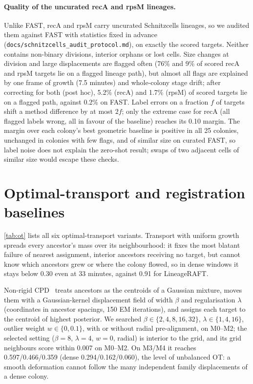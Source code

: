 \documentclass[10pt,twocolumn,letterpaper]{article}
\newcommand{\ours}{LineageRAFT\xspace}
\begin{document}
\paragraph{Quality of the uncurated recA and rpsM lineages.}
Unlike FAST, recA and rpsM carry uncurated Schnitzcells lineages, so we audited them against FAST with statistics fixed in advance (\texttt{docs/schnitzcells\_audit\_protocol.md}), on exactly the scored targets.
Neither contains non-binary divisions, interior orphans or lost cells.
Size changes at division and large displacements are flagged often (76\% and 9\% of scored recA and rpsM targets lie on a flagged lineage path), but almost all flags are explained by one frame of growth (7.5 minutes) and whole-colony stage drift; after correcting for both (post hoc), 5.2\% (recA) and 1.7\% (rpsM) of scored targets lie on a flagged path, against 0.2\% on FAST.
Label errors on a fraction $f$ of targets shift a method difference by at most $2f$; only the extreme case for recA (all flagged labels wrong, all in favour of the baseline) reaches its 0.10 margin.
The margin over each colony's best geometric baseline is positive in all 25 colonies, unchanged in colonies with few flags, and of similar size on curated FAST, so label noise does not explain the zero-shot result; swaps of two adjacent cells of similar size would escape these checks.

\section{Optimal-transport and registration baselines}
\cref{tab:ot} lists all six optimal-transport variants.
Transport with uniform growth spreads every ancestor's mass over its neighbourhood: it fixes the most blatant failure of nearest assignment, interior ancestors receiving no target, but cannot know which ancestors grew or where the colony flowed, so in dense windows it stays below 0.30 even at 33 minutes, against 0.91 for \ours.

Non-rigid CPD~\cite{myronenko2010cpd} treats ancestors as the centroids of a Gaussian mixture, moves them with a Gaussian-kernel displacement field of width $\beta$ and regularisation $\lambda$ (coordinates in ancestor spacings, 150 EM iterations), and assigns each target to the centroid of highest posterior.
We searched $\beta\in\{2,4,8,16,32\}$, $\lambda\in\{1,4,16\}$, outlier weight $w\in\{0,0.1\}$, with or without radial pre-alignment, on M0--M2; the selected setting ($\beta{=}8$, $\lambda{=}4$, $w{=}0$, radial) is interior to the grid, and its grid neighbours score within 0.007 on M0--M2.
On M3/M4 it reaches 0.597/0.466/0.359 (dense 0.294/0.162/0.060), the level of unbalanced OT: a smooth deformation cannot follow the many independent family displacements of a dense colony.
\end{document}
